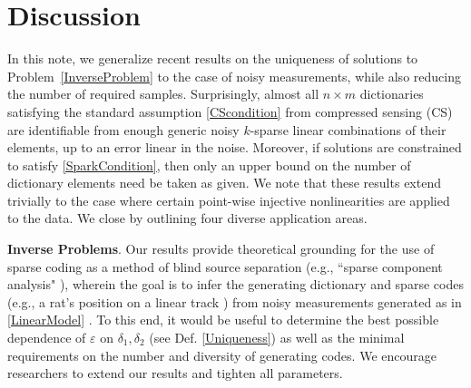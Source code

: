 \documentclass[journal, twocolumn]{IEEEtran}
\begin{document}
\section{Discussion}\label{Discussion}

In this note, we generalize recent results \cite{Hillar15} on the uniqueness of solutions to Problem~\ref{InverseProblem} to the case of noisy measurements, while also reducing the number of required samples.
Surprisingly, almost all $n \times m$ dictionaries satisfying the standard assumption \eqref{CScondition} from compressed sensing (CS) are identifiable from enough generic noisy $k$-sparse linear combinations of their elements, up to an error linear in the noise. Moreover, if solutions are constrained to satisfy \eqref{SparkCondition}, then only an upper bound on the number of dictionary elements need be taken as given. We note that these results extend trivially to the case where certain point-wise injective nonlinearities are applied to the data. We close by outlining  four diverse application areas.


\textbf{Inverse Problems}.  
Our results provide theoretical grounding for the use of sparse coding as a method of blind source separation (e.g., ``sparse component analysis" \cite{li2004analysis}), wherein the goal is to infer the generating dictionary and sparse codes (e.g., a rat's position on a linear track \cite{Agarwal14}) from noisy measurements generated as in \eqref{LinearModel} . To this end, it would be useful to determine the best possible dependence of $\varepsilon$ on $\delta_1, \delta_2$ (see Def. \ref{Uniqueness}) as well as the minimal requirements on the number and diversity of generating codes. We encourage researchers to extend our results and tighten all parameters.
\end{document}
